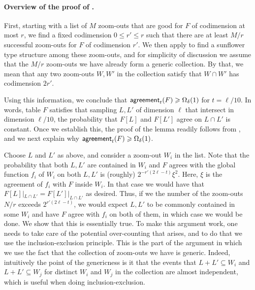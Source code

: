 \documentclass{toc}
\renewcommand\geq{\geqslant}
\renewcommand\leq{\leqslant}
\def\agr{{\sf agreement}}
\begin{document}
\paragraph{Overview of the proof of .} %
First, starting with a list of $M$ zoom-outs
that are good for $F$ of codimension at most $r$, we find a fixed codimension $0\leq r'\leq r$ such that there are at least $M/r$ successful
zoom-outs for $F$ of codimension $r'$. We then apply  to find a sunflower type structure among these zoom-outs,
and for simplicity of discussion we assume that the $M/r$ zoom-outs we have already form a generic collection. By that, we mean that
any two zoom-outs $W,W'$ in the collection satisfy that $W\cap W'$ has codimension $2r'$.

Using this information, we conclude that $\agr_{t}(F)\geq \Omega_{\delta}(1)$ for $t=\ell/10$. In words, table $F$ satisfies that sampling $L,L'$ of dimension $\ell$ that intersect in dimension $\ell/10$, the probability that $F[L]$ and $F[L']$ agree on $L\cap L'$ is constant. Once we establish this, the proof of the lemma readily follows from , and we next explain why $\agr_{t}(F)\geq \Omega_{\delta}(1)$.

Choose $L$ and $L'$ as above, and consider a zoom-out $W_i$ in the list. Note that the probability that both $L,L'$ are contained in $W_i$ and
$F$ agrees with the global function $f_i$ of $W_i$ on both $L,L'$ is (roughly) $2^{-r'(2\ell-t)}\xi^2$. Here, $\xi$ is the agreement of $f_i$ with
$F$ inside $W_i$. In that case we would have that $F[L]|_{L\cap L'} = F[L']|_{L\cap L'}$ as desired. Thus, if we the number of the zoom-outs $N/r$ exceeds $2^{r'(2\ell-t)}$, we would expect $L,L'$ to be commonly contained in some $W_i$ and have $F$ agree with $f_i$ on both of them, in which case
we would be done. We show that this is essentially true. To make this argument work, one needs to take care of the potential
over-counting that arises, and to do that we use the inclusion-exclusion principle. This is the part of the argument in which we use
the fact that the collection of zoom-outs we have is generic. Indeed, intuitively
the point of the genericness is it that the events that $L+L'\subseteq W_i$ and $L+L'\subseteq W_{j}$ for distinct $W_i$ and $W_j$ in the collection are almost independent, which is useful when doing inclusion-exclusion.
\end{document}
